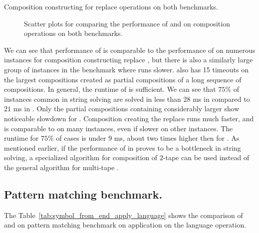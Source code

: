\begin{table}[ht]
  \centering
  
  \caption{
    Composition constructing \nfts for replace operations on both benchmarks.
  }
  \label{tab:composition_construct_replace}
\end{table}

\begin{figure}[ht]
    \centering
    \quad
    \caption{
      Scatter plots for comparing the performance of \mata and \mona on composition operations on both benchmarks.
    }
    \label{fig:composition}%
\end{figure}

We can see that performance of \mata is comparable to the performance of \mona on numerous instances for composition constructing replace \nfts, but there is also a similarly large group of instances in the \transducerPlus benchmark where \mata runs slower.
\mata also has 15 timeouts on the largest compositions created as partial compositions of a long sequence of compositions.
In general, the runtime of \mata is sufficient.
We can see that $75 \%$ of instances common in string solving are solved in less than $28$ ms in \mata compared to $21$ ms in \mona.
Only the partial compositions containing considerably larger \nfts show noticeable slowdown for \mata.
Composition creating the replace \nfts runs much faster, and \mata is comparable to \mona on many instances, even if slower on other instances.
The runtime for $75 \%$ of cases is under $9$ ms, about two times higher then for \mona.
As mentioned earlier, if the performance of \nfts in \mata proves to be a bottleneck in string solving, a specialized algorithm for composition of $2$-tape \nfts can be used instead of the general algorithm for multi-tape \nfts.

\subsection{Pattern matching benchmark.}

The Table~\ref{tab:symbol_from_end_apply_language} shows the comparison of \mata and \mona on pattern matching benchmark \symbolFromEnd on application on the language operation.

